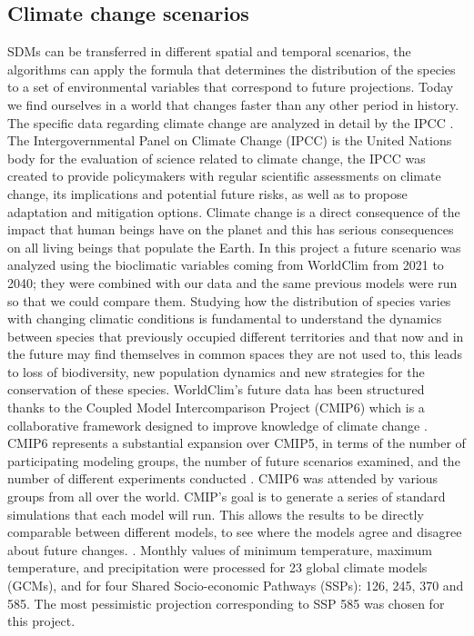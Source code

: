 \documentclass[12pt,a4paper]{article}
\begin{document}
\subsection{Climate change scenarios}
SDMs can be transferred in different spatial and temporal scenarios, the algorithms can apply the formula that determines the distribution of the species to a set of environmental variables that correspond to future projections.
Today we find ourselves in a world that changes faster than any other period in history.    
The specific data regarding climate change are analyzed in detail by the IPCC \citep{ipcc}.
The Intergovernmental Panel on Climate Change (IPCC) is the United Nations body for the evaluation of science related to climate change, the IPCC was created to provide policymakers with regular scientific assessments on climate change, its implications and potential future risks, as well as to propose adaptation and mitigation options\citep{ipcc}.
Climate change is a direct consequence of the impact that human beings have on the planet and this has serious consequences on all living beings that populate the Earth.
In this project a future scenario was analyzed using the bioclimatic variables coming from WorldClim \citep{cmi} from 2021 to 2040; they were combined with our data and the same previous models were run so that we could compare them.
Studying how the distribution of species varies with changing climatic conditions is fundamental to understand the dynamics between species that previously occupied different territories and that now and in the future may find themselves in common spaces they are not used to, this leads to loss of biodiversity, new population dynamics and new strategies for the conservation of these species.
WorldClim's future data has been structured thanks to the Coupled Model Intercomparison Project (CMIP6) which is a collaborative framework designed to improve knowledge of climate change \citep{CMIP6}.
CMIP6 represents a substantial expansion over CMIP5, in terms of the number of participating modeling groups, the number of future scenarios examined, and the number of different experiments conducted \citep{CMIP6}.
CMIP6 was attended by various groups from all over the world.
CMIP's goal is to generate a series of standard simulations that each model will run. This allows the results to be directly comparable between different models, to see where the models agree and disagree about future changes. \citep{CMIP6}.
Monthly values of minimum temperature, maximum temperature, and precipitation were processed for 23 global climate models (GCMs), and for four Shared Socio-economic Pathways (SSPs): 126, 245, 370 and 585. \citep{CMIP619}
The most pessimistic projection corresponding to SSP 585 was chosen for this project.
\newpage
\end{document}
